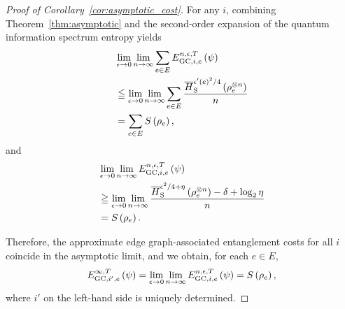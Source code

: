 \documentclass[preprintnumbers,aps,amsmath,amssymb,pra,twocolumn,showpacs,superscriptaddress,floatfix]{revtex4-1}
\theoremstyle{plain}
\theoremstyle{definition}
\theoremstyle{remark}
\begin{document}
\begin{proof}[Proof of Corollary~\ref{cor:asymptotic_cost}]
    For any $i$, combining Theorem~\ref{thm:asymptotic} and the second-order expansion of the quantum information spectrum entropy yields
    \begin{align*}
            &\lim_{\epsilon\to 0}\lim_{n\to\infty}\sum_{e\in E}E_{\textup{GC},i,e}^{n,\epsilon,T}\left(\psi\right)\\
            &\leqq \lim_{\epsilon\to 0}\lim_{n\to\infty}\sum_{e\in E}\frac{\overline{H}_{\textup{S}}^{{\epsilon'(e)}^2/4}\left(\rho_e^{\otimes n}\right)}{n}\\
            &= \sum_{e\in E}S\left(\rho_e\right),
    \end{align*}
    and
    \[
        \begin{split}
            &\lim_{\epsilon\to 0}\lim_{n\to\infty}E_{\textup{GC},i,e}^{n,\epsilon,T}\left(\psi\right)\\
            &\geqq \lim_{\epsilon\to 0}\lim_{n\to\infty}\frac{\overline{H}_{\textup{S}}^{\epsilon^2/4+\eta}\left(\rho_e^{\otimes n}\right)-\delta+\log_2 \eta}{n}\\
            &= S\left(\rho_e\right).
        \end{split}
    \]

    Therefore, the approximate edge graph-associated entanglement costs for all $i$ coincide in the asymptotic limit, and we obtain, for each $e\in E$,
    \[
        E_{\textup{GC},i',e}^{\infty,T}\left(\psi\right)=\lim_{\epsilon\to 0}\lim_{n\to\infty}E_{\textup{GC},i,e}^{n,\epsilon,T}\left(\psi\right)=S\left(\rho_e\right),
    \]
    where $i'$ on the left-hand side is uniquely determined.
\end{proof}


\end{document}
